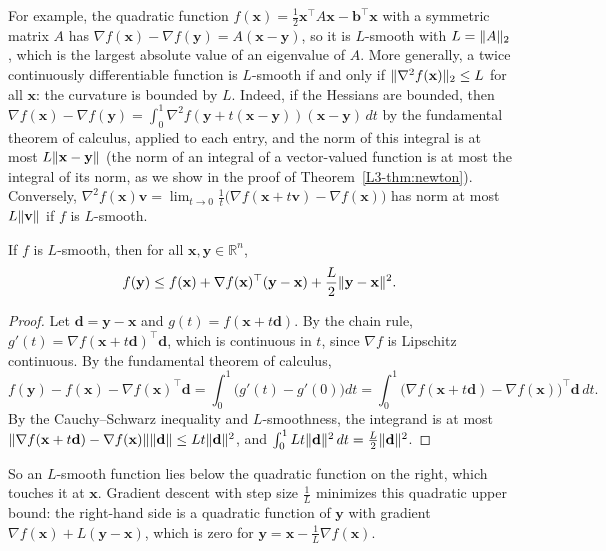 For example, the quadratic function $f(\mathbf{x}) = \frac{1}{2}\mathbf{x}^\top A\mathbf{x} - \mathbf{b}^\top\mathbf{x}$ with a symmetric matrix $A$ has $\nabla f(\mathbf{x}) - \nabla f(\mathbf{y}) = A(\mathbf{x} - \mathbf{y})$, so it is $L$-smooth with $L = \lVert A \rVert_2$, which is the largest absolute value of an eigenvalue of $A$. More generally, a twice continuously differentiable function is $L$-smooth if and only if $\lVert \nabla^2 f(\mathbf{x}) \rVert_2 \leq L$ for all $\mathbf{x}$: the curvature is bounded by $L$. Indeed, if the Hessians are bounded, then $\nabla f(\mathbf{x}) - \nabla f(\mathbf{y}) = \int_0^1 \nabla^2 f(\mathbf{y} + t(\mathbf{x} - \mathbf{y}))(\mathbf{x} - \mathbf{y})\, dt$ by the fundamental theorem of calculus, applied to each entry, and the norm of this integral is at most $L\lVert \mathbf{x} - \mathbf{y} \rVert$ (the norm of an integral of a vector-valued function is at most the integral of its norm, as we show in the proof of Theorem~\ref{L3-thm:newton}). Conversely, $\nabla^2 f(\mathbf{x})\mathbf{v} = \lim_{t \to 0} \frac{1}{t}\big(\nabla f(\mathbf{x} + t\mathbf{v}) - \nabla f(\mathbf{x})\big)$ has norm at most $L\lVert \mathbf{v} \rVert$ if $f$ is $L$-smooth.

\begin{lemma}\label{L3-lem:descent}
    If $f$ is $L$-smooth, then for all $\mathbf{x}, \mathbf{y} \in \mathbb{R}^n$,
    \[f(\mathbf{y}) \leq f(\mathbf{x}) + \nabla f(\mathbf{x})^\top(\mathbf{y} - \mathbf{x}) + \frac{L}{2}\lVert \mathbf{y} - \mathbf{x} \rVert^2.\]
\end{lemma}

\begin{proof}
    Let $\mathbf{d} = \mathbf{y} - \mathbf{x}$ and $g(t) = f(\mathbf{x} + t\mathbf{d})$. By the chain rule, $g'(t) = \nabla f(\mathbf{x} + t\mathbf{d})^\top\mathbf{d}$, which is continuous in $t$, since $\nabla f$ is Lipschitz continuous. By the fundamental theorem of calculus,
    \[f(\mathbf{y}) - f(\mathbf{x}) - \nabla f(\mathbf{x})^\top\mathbf{d} = \int_0^1 \big(g'(t) - g'(0)\big) dt = \int_0^1 \big(\nabla f(\mathbf{x} + t\mathbf{d}) - \nabla f(\mathbf{x})\big)^\top\mathbf{d} \, dt.\]
    By the Cauchy--Schwarz inequality and $L$-smoothness, the integrand is at most $\lVert \nabla f(\mathbf{x} + t\mathbf{d}) - \nabla f(\mathbf{x}) \rVert \lVert \mathbf{d} \rVert \leq Lt\lVert \mathbf{d} \rVert^2$, and $\int_0^1 Lt\lVert \mathbf{d} \rVert^2 \, dt = \frac{L}{2}\lVert \mathbf{d} \rVert^2$.
\end{proof}

So an $L$-smooth function lies below the quadratic function on the right, which touches it at $\mathbf{x}$. Gradient descent with step size $\frac{1}{L}$ minimizes this quadratic upper bound: the right-hand side is a quadratic function of $\mathbf{y}$ with gradient $\nabla f(\mathbf{x}) + L(\mathbf{y} - \mathbf{x})$, which is zero for $\mathbf{y} = \mathbf{x} - \frac{1}{L}\nabla f(\mathbf{x})$.

